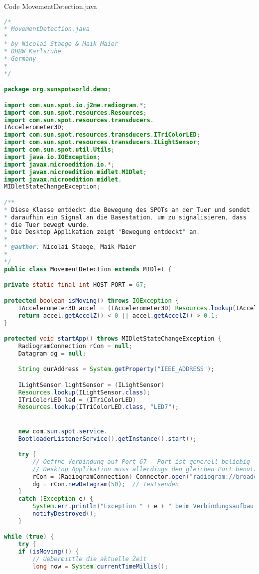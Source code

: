 {\huge Code MovementDetection.java}
\begin{lstlisting}[language=Java,caption={Code MovementDetection.java},label=lst:hoststudi,frame=single]
/*
* MovementDetection.java
*
* by Nicolai Staege & Maik Maier
* DHBW Karlsruhe
* Germany
*
*/

package org.sunspotworld.demo;

import com.sun.spot.io.j2me.radiogram.*;
import com.sun.spot.resources.Resources;
import com.sun.spot.resources.transducers.
IAccelerometer3D;
import com.sun.spot.resources.transducers.ITriColorLED;
import com.sun.spot.resources.transducers.ILightSensor;
import com.sun.spot.util.Utils;
import java.io.IOException;
import javax.microedition.io.*;
import javax.microedition.midlet.MIDlet;
import javax.microedition.midlet.
MIDletStateChangeException;

/**
* Diese Klasse entdeckt die Bewegung des SPOTs an der Tuer und sendet
* daraufhin ein Signal an die Basestation, um zu signalisieren, dass
* die Tuer bewegt wurde.
* Die Desktop Applikation zeigt "Bewegung entdeckt" an.
*
* @author: Nicolai Staege, Maik Maier
* 
*/
public class MovementDetection extends MIDlet {

private static final int HOST_PORT = 67;

protected boolean isMoving() throws IOException {
	IAccelerometer3D accel = (IAccelerometer3D) Resources.lookup(IAccelerometer3D.class);
	return accel.getAccelZ() < 0 || accel.getAccelZ() > 0.1;
}

protected void startApp() throws MIDletStateChangeException {
	RadiogramConnection rCon = null;
	Datagram dg = null;

	String ourAddress = System.getProperty("IEEE_ADDRESS");

	ILightSensor lightSensor = (ILightSensor)
	Resources.lookup(ILightSensor.class);
	ITriColorLED led = (ITriColorLED)
	Resources.lookup(ITriColorLED.class, "LED7");


	new com.sun.spot.service.
	BootloaderListenerService().getInstance().start();

	try {
		// Oeffne Verbindung auf Port 67 - Port ist generell beliebig
		// Desktop Applikation muss allerdings den gleichen Port benutzen
		rCon = (RadiogramConnection) Connector.open("radiogram://broadcast:" + HOST_PORT);
		dg = rCon.newDatagram(50);  // Testsenden
	}
	catch (Exception e) {
		System.err.println("Exception " + e + " beim Verbindungsaufbau.");
		notifyDestroyed();
	}

while (true) {
	try {
	if (isMoving()) {
		// Uebermittle die aktuelle Zeit
		long now = System.currentTimeMillis();


\end{lstlisting}
